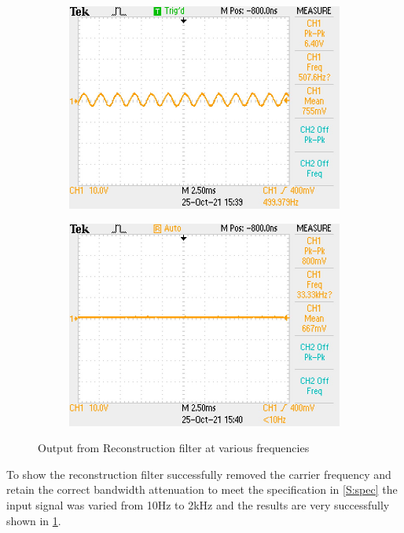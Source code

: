 \documentclass[11pt]{article}
\begin{document}
{\begin{figure}[h!]
\begin{subfigure}{0.3\textwidth}
      \includegraphics[width=\columnwidth]{img/testing/power_output/filter_output_500Hz.JPG}
      \subcaption{}
  \end{subfigure}
  \begin{subfigure}{0.3\textwidth}
      \includegraphics[width=\columnwidth]{img/testing/power_output/filter_output_2kHz.JPG}
      \subcaption{}
  \end{subfigure}
  \caption{Output from Reconstruction filter at various frequencies}
  \label{F:opt_filter_res}
\end{figure}

To show the reconstruction filter successfully removed the carrier frequency and retain the correct bandwidth attenuation to meet the specification in \cref{S:spec} the input signal was varied from 10Hz to 2kHz and the results are very successfully shown in \cref{F:opt_filter_res}.

}
\end{document}

